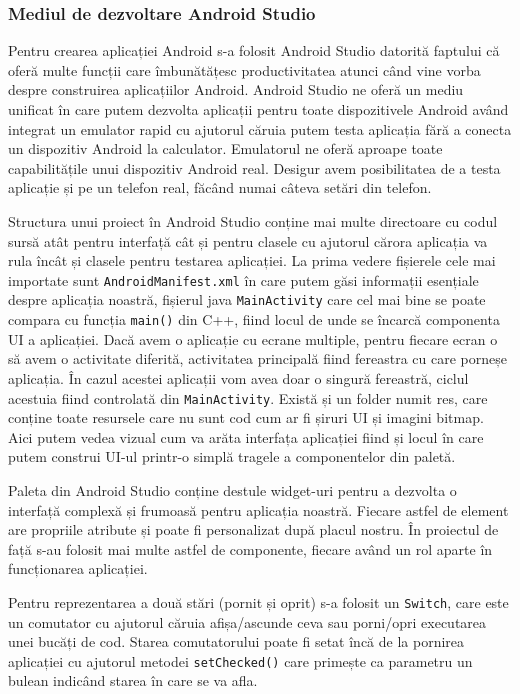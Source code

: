 \documentclass[../IoMusT.tex]{subfiles}
\begin{document}
\subsubsection{Mediul de dezvoltare Android Studio}
Pentru crearea aplicației Android s-a folosit Android Studio datorită faptului că oferă multe funcții care îmbunătățesc productivitatea atunci când vine vorba despre construirea  aplicațiilor Android. Android Studio ne oferă un mediu unificat în care putem dezvolta aplicații pentru toate dispozitivele Android având integrat un emulator rapid cu ajutorul căruia putem testa aplicația fără a conecta un dispozitiv Android la calculator. Emulatorul ne oferă aproape toate capabilitățile unui dispozitiv Android real. Desigur avem posibilitatea de a testa aplicație și pe un telefon real, făcând numai câteva setări din telefon.
\\
\par Structura unui proiect în Android Studio conține mai multe directoare cu codul sursă atât pentru interfață cât și pentru clasele cu ajutorul cărora aplicația va rula încât și clasele pentru testarea aplicației. La prima vedere fișierele cele mai importate sunt \verb|AndroidManifest.xml| în care putem găsi informații esențiale despre aplicația noastră, fișierul java \verb|MainActivity| care cel mai bine se poate compara cu funcția \verb|main()| din C++, fiind locul de unde se încarcă componenta UI a aplicației. Dacă avem o aplicație cu ecrane mul\-tip\-le, pentru fiecare ecran o să avem o activitate diferită, activitatea principală fiind fereastra cu care porneșe aplicația. În cazul acestei aplicații vom avea doar o singură fereastră, ciclul acestuia fiind controlată din \verb|MainActivity|. Există și un folder numit res, care conține toate resursele care nu sunt cod cum ar fi șiruri UI și imagini bitmap. Aici putem vedea vizual cum va arăta interfața aplicației fiind și locul în care putem construi UI-ul printr-o simplă tragele a componentelor din paletă.
\\
\par Paleta din Android Studio conține destule widget-uri pentru a dezvolta o interfață complexă și frumoasă pentru aplicația noastră. Fiecare astfel de element are propriile atribute și poate fi personalizat după placul nostru. În proiectul de față s-au folosit mai multe astfel de componente, fiecare având un rol aparte în funcționarea aplicației.
\\
\par
 Pentru reprezentarea a două stări (pornit și oprit) s-a folosit un \verb|Switch|, care este un comutator cu ajutorul căruia afișa/ascunde ceva sau porni/opri executarea unei bucăți de cod. Starea comutatorului poate fi setat încă de la pornirea aplicației cu ajutorul metodei \verb|setChecked()| care primește ca parametru un bulean indicând starea în care se va afla.
\end{document}
